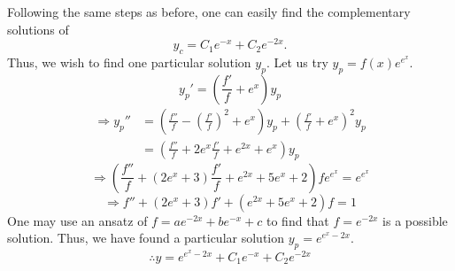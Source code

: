 \item

Following the same steps as before, one can easily find the complementary solutions of
\[
	y_c = C_1 e^{-x} + C_2 e^{-2x}.
\]
Thus, we wish to find one particular solution $y_p$.
Let us try $y_p = f(x) e^{e^x}$.
\[
	y_{p}' = \left( \frac{f'}{f} + e^x \right)y_p
\]
\begin{align*}
	\Rightarrow y_{p}''
	 & = \left( \frac{f''}{f} - {\left( \frac{f'}{f} \right)}^2 + e^x \right)y_p + {\left( \frac{f'}{f} + e^x \right)}^2 y_p \\
	 & = \left( \frac{f''}{f} + 2e^x \frac{f'}{f} + e^{2x} + e^x \right) y_p
\end{align*}
\[
	\Rightarrow \left( \frac{f''}{f} + (2e^x + 3) \frac{f'}{f} + e^{2x} + 5e^x + 2 \right)fe^{e^x} = e^{e^x}
\]
\[
	\Rightarrow f'' + (2e^x + 3)f' + (e^{2x} + 5e^x + 2)f = 1
\]
One may use an ansatz of $f = ae^{-2x} + be^{-x} + c$ to find that $f = e^{-2x}$ is a possible solution.
Thus, we have found a particular solution $y_p = e^{e^x - 2x}$.
\[
	\therefore y = e^{e^x - 2x} + C_1 e^{-x} + C_2 e^{-2x}
\]